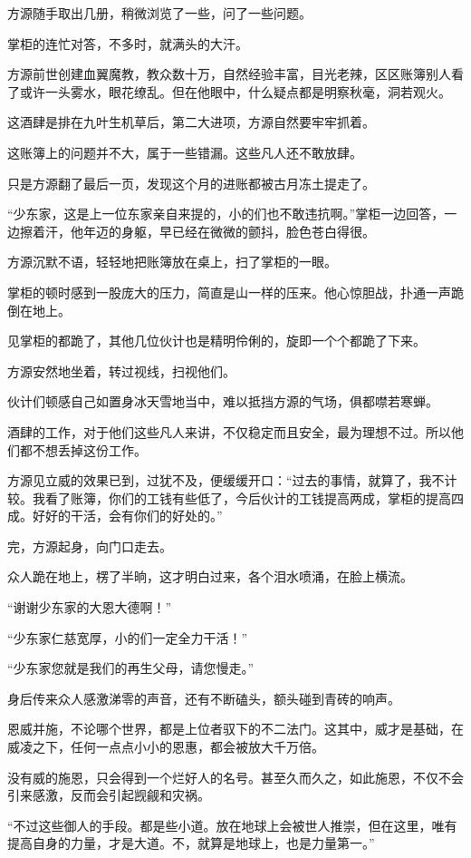 \begin{this_body}
方源随手取出几册，稍微浏览了一些，问了一些问题。

掌柜的连忙对答，不多时，就满头的大汗。

方源前世创建血翼魔教，教众数十万，自然经验丰富，目光老辣，区区账簿别人看了或许一头雾水，眼花缭乱。但在他眼中，什么疑点都是明察秋毫，洞若观火。

这酒肆是排在九叶生机草后，第二大进项，方源自然要牢牢抓着。

这账簿上的问题并不大，属于一些错漏。这些凡人还不敢放肆。

只是方源翻了最后一页，发现这个月的进账都被古月冻土提走了。

“少东家，这是上一位东家亲自来提的，小的们也不敢违抗啊。”掌柜一边回答，一边擦着汗，他年迈的身躯，早已经在微微的颤抖，脸色苍白得很。

方源沉默不语，轻轻地把账簿放在桌上，扫了掌柜的一眼。

掌柜的顿时感到一股庞大的压力，简直是山一样的压来。他心惊胆战，扑通一声跪倒在地上。

见掌柜的都跪了，其他几位伙计也是精明伶俐的，旋即一个个都跪了下来。

方源安然地坐着，转过视线，扫视他们。

伙计们顿感自己如置身冰天雪地当中，难以抵挡方源的气场，俱都噤若寒蝉。

酒肆的工作，对于他们这些凡人来讲，不仅稳定而且安全，最为理想不过。所以他们都不想丢掉这份工作。

方源见立威的效果已到，过犹不及，便缓缓开口：“过去的事情，就算了，我不计较。我看了账簿，你们的工钱有些低了，今后伙计的工钱提高两成，掌柜的提高四成。好好的干活，会有你们的好处的。”

完，方源起身，向门口走去。

众人跪在地上，楞了半晌，这才明白过来，各个泪水喷涌，在脸上横流。

“谢谢少东家的大恩大德啊！”

“少东家仁慈宽厚，小的们一定全力干活！”

“少东家您就是我们的再生父母，请您慢走。”

身后传来众人感激涕零的声音，还有不断磕头，额头碰到青砖的响声。

恩威并施，不论哪个世界，都是上位者驭下的不二法门。这其中，威才是基础，在威凌之下，任何一点点小小的恩惠，都会被放大千万倍。

没有威的施恩，只会得到一个烂好人的名号。甚至久而久之，如此施恩，不仅不会引来感激，反而会引起觊觎和灾祸。

“不过这些御人的手段。都是些小道。放在地球上会被世人推崇，但在这里，唯有提高自身的力量，才是大道。不，就算是地球上，也是力量第一。”


\end{this_body}

